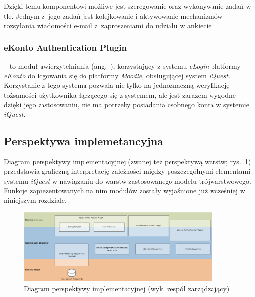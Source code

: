 Dzięki temu komponentowi możliwe jest szeregowanie oraz wykonywanie zadań w tle. Jednym z~jego zadań jest kolejkowanie i aktywowanie mechanizmów rozsyłania wiadomości e-mail z~zaproszeniami do udziału w ankiecie.

\subsubsection{eKonto Authentication Plugin}
\label{Chapter5425}

 -- to moduł uwierzytelniania (ang.~), korzystający z systemu \textit{eLogin} platformy \textit{eKonto} do logowania się do platformy \textit{Moodle}, obsługującej system \textit{iQuest}. Korzystanie z tego systemu pozwala nie tylko na jednoznaczną weryfikację tożsamości użytkownika łączącego się z systemem, ale jest zarazem wygodne -- dzięki jego zastosowaniu, nie ma potrzeby posiadania osobnego konta w systemie \textit{iQuest}.

\subsection{Perspektywa implemetancyjna}
\label{Chapter543}

Diagram perspektywy implementacyjnej (zwanej też perspektywą warstw; rys.~\ref{rys:PerspektywaImplementacyjna}) przedstawia graficzną interpretację zależności między poszczególnymi elementami systemu \textit{iQuest} w nawiązaniu do warstw zastosowanego modelu trójwarstwowego. Funkcje zaprezentowanych na nim modułów zostały wyjaśnione już wcześniej w niniejszym rozdziale.

\newpage
\begin{landscape}
\begin{figure}[H]
\centering\includegraphics[width=0.9\textwidth]{figures/Layers}
\caption{Diagram perspektywy implementacyjnej (wyk. zespół zarządzający)}\label{rys:PerspektywaImplementacyjna}
\end{figure}
\end{landscape}
\newpage

